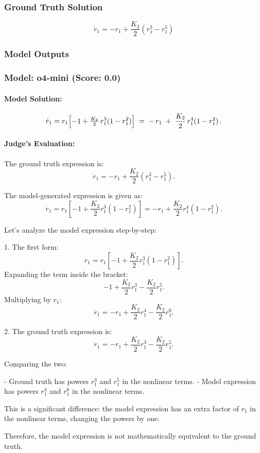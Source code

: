 \documentclass[10pt]{article}
\begin{document}
\subsubsection*{Ground Truth Solution}
\[ \boxed{\dot{r}_1 = -r_1 + \frac{K_2}{2} (r_1^3 - r_1^5)} \]

\subsubsection*{Model Outputs}
\subsubsection*{Model: o4-mini (Score: 0.0)}
\paragraph*{Model Solution:}
\[ \dot r_1
= r_1\Bigl[-1+\tfrac{K_2}{2}\,r_1^3(1-r_1^2)\Bigr]
\;=\;-\,r_1 \;+\;\frac{K_2}{2}\,r_1^4(1-r_1^2)\,. \]

\paragraph*{Judge's Evaluation:}

The ground truth expression is:
\[
\dot{r}_1 = -r_1 + \frac{K_2}{2} (r_1^3 - r_1^5).
\]

The model-generated expression is given as:
\[
\dot{r}_1 = r_1 \left[-1 + \frac{K_2}{2} r_1^3 (1 - r_1^2) \right] = -r_1 + \frac{K_2}{2} r_1^4 (1 - r_1^2).
\]

Let's analyze the model expression step-by-step:

1. The first form:
\[
\dot{r}_1 = r_1 \left[-1 + \frac{K_2}{2} r_1^3 (1 - r_1^2) \right].
\]
Expanding the term inside the bracket:
\[
-1 + \frac{K_2}{2} r_1^3 - \frac{K_2}{2} r_1^5.
\]
Multiplying by \(r_1\):
\[
\dot{r}_1 = -r_1 + \frac{K_2}{2} r_1^4 - \frac{K_2}{2} r_1^6.
\]

2. The ground truth expression is:
\[
\dot{r}_1 = -r_1 + \frac{K_2}{2} r_1^3 - \frac{K_2}{2} r_1^5.
\]

Comparing the two:

- Ground truth has powers \(r_1^3\) and \(r_1^5\) in the nonlinear terms.
- Model expression has powers \(r_1^4\) and \(r_1^6\) in the nonlinear terms.

This is a significant difference: the model expression has an extra factor of \(r_1\) in the nonlinear terms, changing the powers by one.

Therefore, the model expression is not mathematically equivalent to the ground truth.
\end{document}
